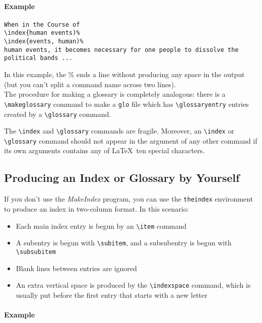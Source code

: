 \documentclass{article}
\newcommand{\justtext}[1]{\texttt{\textbackslash #1}}
\begin{document}
\paragraph{Example}

\begin{verbatim}
When in the Course of
\index{human events)%
\index{events, human)%
human events, it becomes necessary for one people to dissolve the political bands ...
\end{verbatim}

\noindent In this example, the \% ends a line without producing any space in the output (but you
 can't split a command name across two lines).\\

The procedure for making a glossary is completely analogous: 
there is a \justtext{makeglossary} command to make a {\tt glo} file which has 
\justtext{glossaryentry} entries created by a \justtext{glossary} command.

The \justtext{index} and \justtext{glossary} commands are fragile. Moreover,
an \justtext{index} or \justtext{glossary} command should not appear in the argument of any other
command if its own arguments contains any of \LaTeX\ ten special characters.

\subsection{Producing an Index or Glossary by Yourself}\label{manual-production-index}

If you don't use the \emph{MakeIndex} program, you can use the {\tt theindex} environment to produce
an index in two-column format. In this scenario:

\begin{itemize}
   \item Each main index entry is begun by an \justtext{item} command
   \item A subentry is begun with \justtext{subitem}, and a subsubentry is begun with 
         \justtext{subsubitem}
   \item Blank lines between entries are ignored
   \item An extra vertical space is produced by the \justtext{indexspace} command, which is usually
    put before the first entry that starts with a new letter
\end{itemize}

\paragraph{Example}
\end{document}
